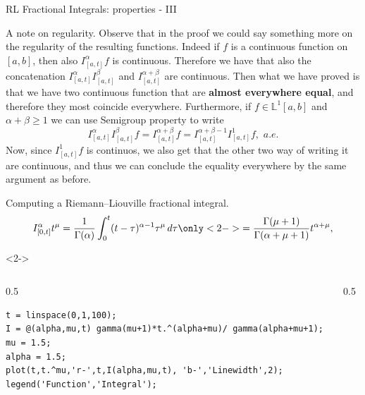 \documentclass[aspectratio=169,xcolor=dvipsnames]{beamer}
\begin{document}
\begin{frame}{RL Fractional Integrals: properties - III}
\begin{exampleblock}{A note on regularity.}
Observe that in the proof we could say something
more on the regularity of the resulting functions. Indeed if $f$ is a continuous
function on $[a,b]$, then also $I_{[a,t]}^\alpha f$ is continuous. Therefore we have
that also the concatenation $I^\alpha_{[a,t]} I^\beta_{[a,t]}$ and $I_{[a,t]}^{\alpha+\beta}$ are
continuous. Then what we have proved is that we have two continuous function that
are \textbf{almost everywhere equal}, and therefore they most coincide everywhere.
Furthermore, if $f \in \mathbb{L}^1[a,b]$ and $\alpha+\beta \geq 1$ we can use \alert{Semigroup property} to write
\[
I_{[a,t]}^\alpha I_{[a,t]}^\beta f = I_{[a,t]}^{\alpha + \beta} f  = I_{[a,t]}^{\alpha + \beta - 1} I_{[a,t]}^{1} f, \textit{ a.e.}
\]
Now, since $I_{[a,t]}^1 f$ is continuos, we also get that the other two way of writing
it are continuous, and thus we can conclude the equality everywhere by the same
argument as before.
\end{exampleblock}
\end{frame}

\begin{frame}[fragile]{Computing a Riemann--Liouville fractional integral.}
\[
I_{[0,t]}^\alpha t^\mu = \frac{1}{\Gamma({\alpha})} \int_{0}^{t} (t-\tau)^{{\alpha} - 1} \tau^\mu \,d\tau \only<2->{= \frac{\Gamma(\mu+1)}{\Gamma(\alpha+\mu+1)}t^{\alpha+\mu}},
\]
\begin{onlyenv}<2->
\begin{columns}
\begin{column}{0.5\columnwidth}
\begin{verbatim}
t = linspace(0,1,100);
I = @(alpha,mu,t) gamma(mu+1)*t.^(alpha+mu)/ gamma(alpha+mu+1);
mu = 1.5;
alpha = 1.5;
plot(t,t.^mu,'r-',t,I(alpha,mu,t), 'b-','Linewidth',2);
legend('Function','Integral');
\end{verbatim}

\end{column}
\begin{column}{0.5\columnwidth}

\end{column}
\end{columns}
\end{onlyenv}
\end{frame}
\end{document}
